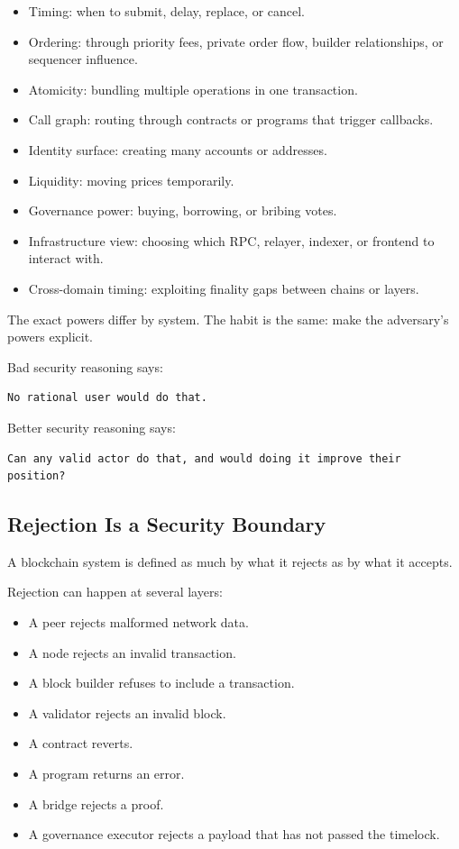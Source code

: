 \begin{itemize}
\tightlist
\item
  Timing: when to submit, delay, replace, or cancel.
\item
  Ordering: through priority fees, private order flow, builder
  relationships, or sequencer influence.
\item
  Atomicity: bundling multiple operations in one transaction.
\item
  Call graph: routing through contracts or programs that trigger
  callbacks.
\item
  Identity surface: creating many accounts or addresses.
\item
  Liquidity: moving prices temporarily.
\item
  Governance power: buying, borrowing, or bribing votes.
\item
  Infrastructure view: choosing which RPC, relayer, indexer, or frontend
  to interact with.
\item
  Cross-domain timing: exploiting finality gaps between chains or
  layers.
\end{itemize}

The exact powers differ by system. The habit is the same: make the
adversary's powers explicit.

Bad security reasoning says:

\begin{lstlisting}
No rational user would do that.
\end{lstlisting}

Better security reasoning says:

\begin{lstlisting}
Can any valid actor do that, and would doing it improve their position?
\end{lstlisting}

\subsection{Rejection Is a Security Boundary}

A blockchain system is defined as much by what it rejects as by what it
accepts.

Rejection can happen at several layers:

\begin{itemize}
\tightlist
\item
  A peer rejects malformed network data.
\item
  A node rejects an invalid transaction.
\item
  A block builder refuses to include a transaction.
\item
  A validator rejects an invalid block.
\item
  A contract reverts.
\item
  A program returns an error.
\item
  A bridge rejects a proof.
\item
  A governance executor rejects a payload that has not passed the
  timelock.
\end{itemize}

